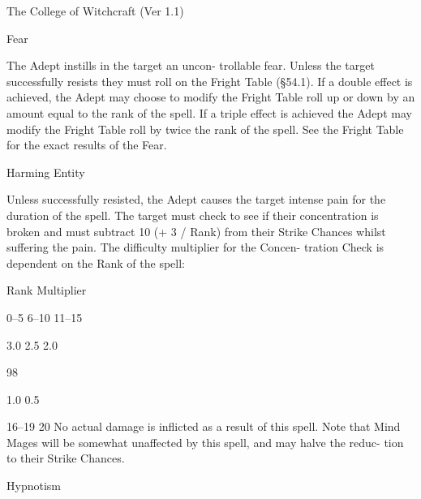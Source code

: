 \begin{Chapter}{The College of Witchcraft (Ver 1.1)}
\begin{spell}[G-4]{Fear }

\begin{effects}
 The  Adept  instills  in  the  target  an  uncon-
trollable fear. Unless the target successfully resists 
they  must  roll  on  the  Fright  Table  (§54.1).  If  a 
double effect is achieved, the Adept may choose to 
modify  the  Fright  Table  roll  up  or  down  by  an 
amount  equal  to  the  rank  of  the  spell.  If  a  triple 
effect is achieved the Adept may modify the Fright 
Table  roll  by  twice  the  rank  of  the  spell.  See  the 
Fright Table for the exact results of the Fear. 

\end{effects}
\end{spell}

\begin{spell}[G-5]{Harming Entity }

\begin{effects}
 Unless  successfully  resisted,  the  Adept 
causes  the  target  intense  pain  for  the  duration  of 
the  spell.  The  target  must  check  to  see  if  their 
concentration is broken and must subtract 10 (+ 3 / 
Rank)  from  their  Strike  Chances  whilst  suffering 
the  pain.  The  difficulty  multiplier  for  the  Concen-
tration  Check  is  dependent  on  the  Rank  of  the 
spell: 

Rank  Multiplier 

0–5 
6–10 
11–15 

3.0 
2.5 
2.0 

98 

1.0 
0.5 

16–19 
20 
No  actual  damage  is  inflicted  as  a  result  of  this 
spell.  Note  that  Mind  Mages  will  be  somewhat 
unaffected  by  this  spell,  and  may  halve  the  reduc-
tion to their Strike Chances. 

\end{effects}
\end{spell}

\begin{spell}[G-6]{Hypnotism }


\end{spell}
\end{Chapter}
